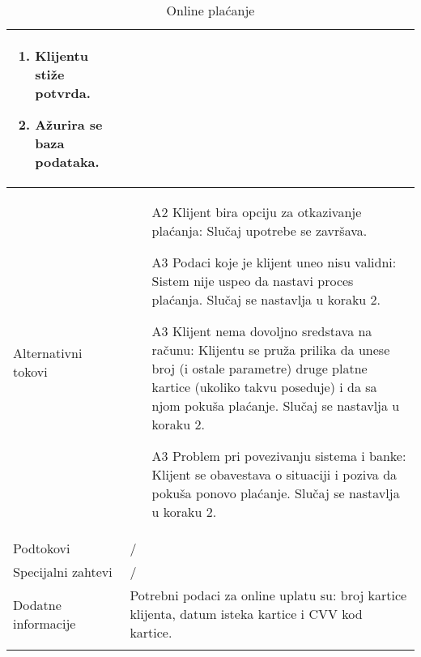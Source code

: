 \documentclass[../main.tex]{subfiles}
\begin{document}
\begin{longtable}{| p{} | p{} |}
\begin{enumerate}
        \item Klijentu stiže potvrda.
        \item Ažurira se baza podataka.
    \end{enumerate}\\
\hline
    Alternativni tokovi & \begin{enumerate}
       	    \item [A2] Klijent bira opciju za otkazivanje plaćanja: Slučaj upotrebe se završava.
        	\item [A3] Podaci koje je klijent uneo nisu validni: Sistem nije uspeo da nastavi proces plaćanja. Slučaj se nastavlja u koraku 2.
        	\item [A3] Klijent nema dovoljno sredstava na računu: Klijentu se pruža prilika da unese broj (i ostale parametre) druge platne kartice (ukoliko takvu poseduje) i da sa njom pokuša plaćanje. Slučaj se nastavlja u koraku 2. %
        	\item [A3] Problem pri povezivanju sistema i banke: Klijent se obavestava o situaciji i poziva da pokuša ponovo plaćanje. Slučaj se nastavlja u koraku 2.
            \end{enumerate}\\
\hline
    Podtokovi & / \\
\hline
    Specijalni zahtevi & / \\
\hline
    Dodatne informacije & Potrebni podaci za online uplatu su: broj kartice klijenta, datum isteka kartice i CVV kod kartice. \\
\hline
\caption{Online plaćanje} %
\label{tab:myfirstlongtable}
\end{longtable}

\end{document}
